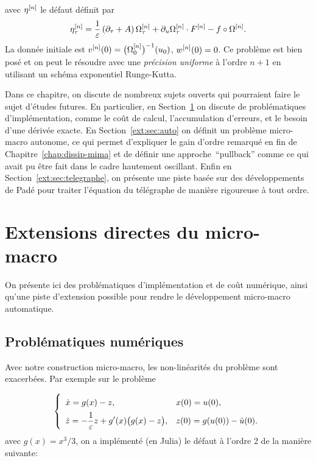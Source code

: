 avec $\eta^{[n]}$ le défaut définit par
\begin{equation} \label{ext:def:eta}
    \eta^{[n]}_{\tau} = 
    \frac{1}{\varepsilon}\left( \partial_{\tau} +  A \right) \Omega^{[n]}_{\tau} 
    + \partial_{u} \Omega^{[n]}_{\tau} \cdot F^{[n]} - f \circ \Omega^{[n]} . 
\end{equation}
La donnée initiale est $v^{[n]} (0) = \big( \Omega^{[n]} _0 \big)^{-1} (u_0)$, $w^{[n]} (0) = 0$. Ce problème est bien posé et on peut le résoudre avec une \textit{précision uniforme} à l'ordre $n+1$ en utilisant un schéma exponentiel Runge-Kutta. 

Dans ce chapitre, on discute de nombreux sujets ouverts qui pourraient faire le sujet d'études futures. En particulier, en Section~\ref{ext:sec:direct} on discute de problématiques d'implémentation, comme le coût de calcul, l'accumulation d'erreurs, et le besoin d'une dérivée exacte. En Section~\ref{ext:sec:auto} on définit un problème micro-macro autonome, ce qui permet d'expliquer le gain d'ordre remarqué en fin de Chapitre~\ref{chap:dissip-mima} et de définir une approche~\enquote{pullback} comme ce qui avait pu être fait dans le cadre hautement oscillant. Enfin en Section~\ref{ext:sec:telegraphe}, on présente une piste basée sur des développements de Padé pour traiter l'équation du télégraphe de manière rigoureuse à tout ordre. 


\section{Extensions directes du micro-macro}
\label{ext:sec:direct}

On présente ici des problématiques d'implémentation et de coût numérique, ainsi qu'une piste d'extension possible pour rendre le développement micro-macro automatique.


\subsection{Problématiques numériques}

Avec notre construction micro-macro, les non-linéarités du problème sont exacerbées. Par exemple sur le problème

\begin{equation*} 
    \left\lbrace\begin{array}{ll} \displaystyle \vphantom{\int}
      \dot x = g(x) - z , 
      & x(0) = u(0) , \\ \displaystyle
      \dot z = -\frac{1}{\varepsilon} z + g'(x) \big( g(x) - z \big) ,
      & z(0) = g(u(0)) - \tilde{u}(0) .
    \end{array}\right.
\end{equation*}
avec $g(x) = x^3/3$, on a implémenté (en Julia) le défaut à l'ordre 2 de la manière suivante:



